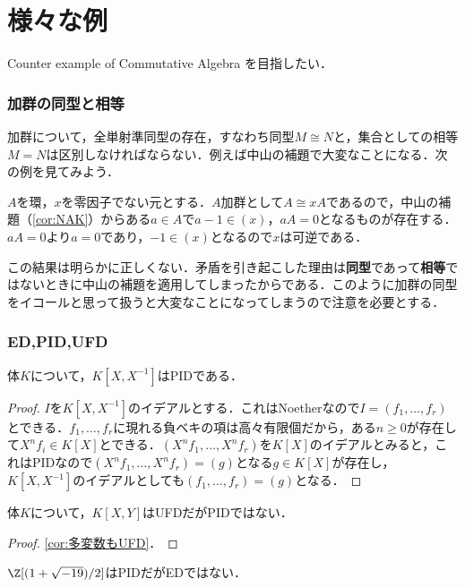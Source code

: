 \part[Appendix \thepart, Various Example]{様々な例}

Counter example of Commutative Algebra を目指したい．

\section{加群の同型と相等}

加群について，全単射準同型の存在，すなわち同型$M\cong N$と，集合としての相等$M=N$は区別しなければならない．例えば中山の補題で大変なことになる．次の例を見てみよう．

\begin{ex}
	$A$を環，$x$を零因子でない元とする．$A$加群として$A\cong xA$であるので，中山の補題（\ref{cor:NAK}）からある$a\in A$で$a-1\in(x)，aA=0$となるものが存在する．$aA=0$より$a=0$であり，$-1\in (x)$となるので$x$は可逆である．
\end{ex}

この結果は明らかに正しくない．矛盾を引き起こした理由は\textbf{同型}であって\textbf{相等}ではないときに中山の補題を適用してしまったからである．このように加群の同型をイコールと思って扱うと大変なことになってしまうので注意を必要とする．
\section{ED,PID,UFD}
\begin{surex}
	体$K$について，$K[X,X^{-1}]$はPIDである．
\end{surex}

\begin{proof}
	$I$を$K[X,X^{-1}]$のイデアルとする．これはNoetherなので$I=(f_1,\dots,f_r)$とできる．$f_1,\dots,f_r$に現れる負ベキの項は高々有限個だから，ある$n\geq0$が存在して$X^nf_i\in K[X]$とできる．$(X^nf_1,\dots,X^nf_r)$を$K[X]$のイデアルとみると，これはPIDなので$(X^nf_1,\dots,X^nf_r)=(g)$となる$g\in K[X]$が存在し，$K[X,X^{-1}]$のイデアルとしても$(f_1,\dots,f_r)=(g)$となる．
\end{proof}
\begin{surex}[UFDだがPIDでない環]
	体$K$について，$K[X,Y]$はUFDだがPIDではない．
\end{surex}

\begin{proof}
	\ref{cor:多変数もUFD}．
\end{proof}
\begin{surex}[PIDだがEDでない環]
	$\Z[(1+\sqrt{-19})/2]$はPIDだがEDではない．
\end{surex}

